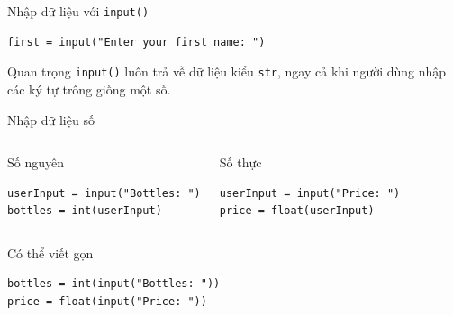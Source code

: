 \documentclass[aspectratio=169,10pt]{beamer}
\begin{document}
\begin{frame}[fragile]{Nhập dữ liệu với \texttt{input()}}
\begin{lstlisting}
first = input("Enter your first name: ")
\end{lstlisting}
\begin{center}
\end{center}
\begin{alertblock}{Quan trọng}
\texttt{input()} luôn trả về dữ liệu kiểu \texttt{str}, ngay cả khi người dùng nhập các ký tự trông giống một số.
\end{alertblock}
\end{frame}

\begin{frame}[fragile]{Nhập dữ liệu số}
\begin{columns}[T,onlytextwidth]
\begin{block}{Số nguyên}
\begin{lstlisting}
userInput = input("Bottles: ")
bottles = int(userInput)
\end{lstlisting}
\end{block}
\begin{block}{Số thực}
\begin{lstlisting}
userInput = input("Price: ")
price = float(userInput)
\end{lstlisting}
\end{block}
\end{columns}
\vspace{0.2cm}
\begin{block}{Có thể viết gọn}
\begin{lstlisting}
bottles = int(input("Bottles: "))
price = float(input("Price: "))
\end{lstlisting}
\end{block}
\end{frame}
\end{document}
